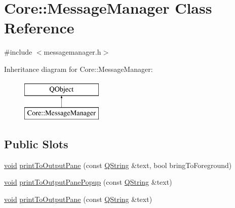 \hypertarget{class_core_1_1_message_manager}{\section{Core\-:\-:Message\-Manager Class Reference}
\label{class_core_1_1_message_manager}
}


{\ttfamily \#include $<$messagemanager.\-h$>$}

Inheritance diagram for Core\-:\-:Message\-Manager\-:\begin{figure}[H]
\begin{center}
\leavevmode
\includegraphics[height=2.000000cm]{class_core_1_1_message_manager}
\end{center}
\end{figure}
\subsection*{Public Slots}
\begin{DoxyCompactItemize}
\item 
\hyperlink{group___u_a_v_objects_plugin_ga444cf2ff3f0ecbe028adce838d373f5c}{void} \hyperlink{group___core_plugin_ga909deae01f2b3748fe8ac76443102d32}{print\-To\-Output\-Pane} (const \hyperlink{group___u_a_v_objects_plugin_gab9d252f49c333c94a72f97ce3105a32d}{Q\-String} \&text, bool bring\-To\-Foreground)
\item 
\hyperlink{group___u_a_v_objects_plugin_ga444cf2ff3f0ecbe028adce838d373f5c}{void} \hyperlink{group___core_plugin_ga2dc4635e01c834a7d118528d7bb077e2}{print\-To\-Output\-Pane\-Popup} (const \hyperlink{group___u_a_v_objects_plugin_gab9d252f49c333c94a72f97ce3105a32d}{Q\-String} \&text)
\item 
\hyperlink{group___u_a_v_objects_plugin_ga444cf2ff3f0ecbe028adce838d373f5c}{void} \hyperlink{group___core_plugin_gac367c5893851aab11c5d00c81494940a}{print\-To\-Output\-Pane} (const \hyperlink{group___u_a_v_objects_plugin_gab9d252f49c333c94a72f97ce3105a32d}{Q\-String} \&text)
\end{DoxyCompactItemize}
